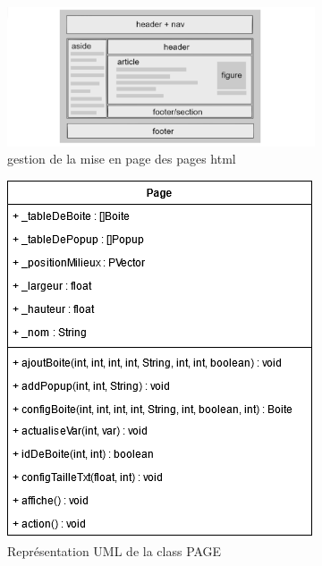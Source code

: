 \documentclass[10pt,a4paper]{article}
\begin{document}
\begin{figure}[h!]
\begin{subfigure}{.4\textwidth}
	\centering
	\includegraphics[width=.9\linewidth]{html.png}
  	\caption{gestion de la mise en page des pages html}
  	\label{fig1}
\end{subfigure}
\begin{subfigure}{.25\textwidth}
	\centering
	\includegraphics[width=.9\linewidth]{Page.png}
  	\caption{Représentation UML de la class PAGE}
  	\label{fi2}
\end{subfigure}
\begin{subfigure}{.25\textwidth}
	\centering

\end{subfigure}
\end{figure}
\end{document}

